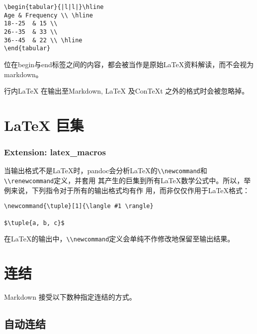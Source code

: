 \documentclass[cn]{elegantbook}
\newcommand{\passthrough}[1]{#1}
\begin{document}
\begin{lstlisting}
\begin{tabular}{|l|l|}\hline
Age & Frequency \\ \hline
18--25  & 15 \\
26--35  & 33 \\
36--45  & 22 \\ \hline
\end{tabular}
\end{lstlisting}

位在begin与end标签之间的内容，都会被当作是原始LaTeX资料解读，而不会视为markdown。

行内LaTeX 在输出至Markdown, LaTeX 及ConTeXt 之外的格式时会被忽略掉。

\hypertarget{latex-ux5de8ux96c6}{%
\section{LaTeX 巨集}\label{latex-ux5de8ux96c6}}

\hypertarget{extension-latex_macros}{%
\subsubsection{Extension: latex\_macros}\label{extension-latex_macros}}

当输出格式不是LaTeX时，pandoc会分析LaTeX的\passthrough{\lstinline!\\newcommand!}和\passthrough{\lstinline!\\renewcommand!}定义，并套用
其产生的巨集到所有LaTeX数学公式中。所以，举例来说，下列指令对于所有的输出格式均有作
用，而非仅仅作用于LaTeX格式：

\begin{lstlisting}
\newcommand{\tuple}[1]{\langle #1 \rangle}

$\tuple{a, b, c}$
\end{lstlisting}

在LaTeX的输出中，\passthrough{\lstinline!\\newcommand!}定义会单纯不作修改地保留至输出结果。

\hypertarget{ux8fdeux7ed3}{%
\section{连结}\label{ux8fdeux7ed3}}

Markdown 接受以下数种指定连结的方式。

\hypertarget{ux81eaux52a8ux8fdeux7ed3}{%
\subsection{自动连结}\label{ux81eaux52a8ux8fdeux7ed3}}
\end{document}
